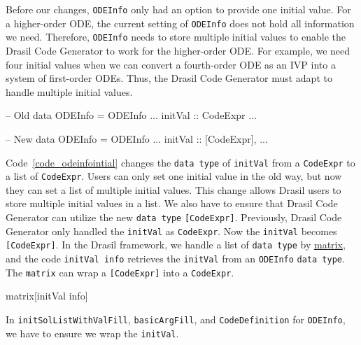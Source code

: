 Before our changes, \verb|ODEInfo| only had an option to provide one initial value. For a higher-order ODE, the current setting of \verb|ODEInfo| does not hold all information we need. Therefore, \verb|ODEInfo| needs to store multiple initial values to enable the Drasil Code Generator to work for the higher-order ODE. For example, we need four initial values when we can convert a fourth-order ODE as an IVP into a system of first-order ODEs. Thus, the Drasil Code Generator must adapt to handle multiple initial values.

\begin{listing}[ht]
\begin{haskell1}
-- Old 
data ODEInfo = ODEInfo {
  ...
  initVal :: CodeExpr
  ...
}

-- New 
data ODEInfo = ODEInfo {
  ...
  initVal :: [CodeExpr],
  ...
}
\end{haskell1}
\label{code_odeinfointial}
\end{listing}
Code~\ref{code_odeinfointial} changes the \verb|data type| of \verb|initVal| from a \verb|CodeExpr| to a list of \verb|CodeExpr|. Users can only set one initial value in the old way, but now they can set a list of multiple initial values. This change allows Drasil users to store multiple initial values in a list. We also have to ensure that Drasil Code Generator can utilize the new \verb|data type| \verb|[CodeExpr]|. Previously, Drasil Code Generator only handled the \verb|initVal| as \verb|CodeExpr|. Now the \verb|initVal| becomes \verb|[CodeExpr]|. In the Drasil framework, we handle a list of \verb|data type| by \href{https://jacquescarette.github.io/Drasil/docs/drasil-code-base-0.1.9.0/Language-Drasil-CodeExpr.html#v:matrix}{matrix}, and the code \verb|initVal info| retrieves the \verb|initVal| from an \verb|ODEInfo| \verb|data type|. The \verb|matrix| can wrap a \verb|[CodeExpr]| into a \verb|CodeExpr|. 

\begin{listing}[ht]
\begin{haskell1}
matrix[initVal info]
\end{haskell1}
\end{listing}

In \verb|initSolListWithValFill|, \verb|basicArgFill|, and \verb|CodeDefinition| for \verb|ODEInfo|, we have to ensure we wrap the \verb|initVal|.

